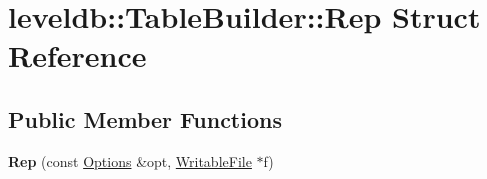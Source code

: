 \hypertarget{structleveldb_1_1_table_builder_1_1_rep}{}\section{leveldb\+::Table\+Builder\+::Rep Struct Reference}
\label{structleveldb_1_1_table_builder_1_1_rep}
\subsection*{Public Member Functions}
\begin{DoxyCompactItemize}
\item 
\mbox{\label{structleveldb_1_1_table_builder_1_1_rep_a9d68c60c57e7336aa1fd10fc9f32213e}} 
{\bfseries Rep} (const \mbox{\hyperlink{structleveldb_1_1_options}{Options}} \&opt, \mbox{\hyperlink{classleveldb_1_1_writable_file}{Writable\+File}} $\ast$f)
\end{DoxyCompactItemize}
